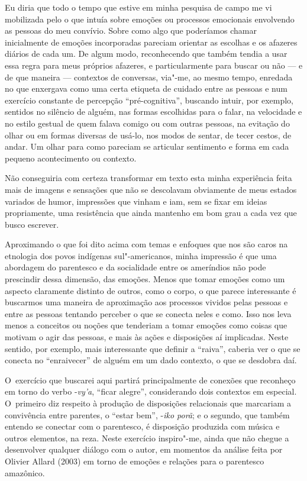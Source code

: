 Eu diria que todo o tempo que estive em minha pesquisa de campo me vi
mobilizada pelo o que intuía sobre emoções ou processos emocionais
envolvendo as pessoas do meu convívio. Sobre como algo que poderíamos
chamar inicialmente de emoções incorporadas pareciam orientar as
escolhas e os afazeres diários de cada um. De algum modo, reconhecendo
que também tendia a usar essa regra para meus próprios afazeres, e
particularmente para buscar ou não --- e de que maneira --- contextos de
conversas, via"-me, ao mesmo tempo, enredada no que enxergava como uma
certa etiqueta de cuidado entre as pessoas e num exercício constante de
percepção ``pré-cognitiva'', buscando intuir, por exemplo, sentidos no
silêncio de alguém, nas formas escolhidas para o falar, na velocidade e
no estilo gestual de quem falava comigo ou com outras pessoas, na
evitação do olhar ou em formas diversas de usá-lo, nos modos de sentar,
de tecer cestos, de andar. Um olhar para como pareciam se articular
sentimento e forma em cada pequeno acontecimento ou contexto.

Não conseguiria com certeza transformar em texto esta minha experiência
feita mais de imagens e sensações que não se descolavam obviamente de
meus estados variados de humor, impressões que vinham e iam, sem se
fixar em ideias propriamente, uma resistência que ainda mantenho em bom
grau a cada vez que busco escrever.

Aproximando o que foi dito acima com temas e enfoques que nos são caros
na etnologia dos povos indígenas sul"-americanos, minha impressão é que
uma abordagem do parentesco e da socialidade entre os ameríndios não
pode prescindir dessa dimensão, das emoções. Menos que tomar emoções
como um aspecto claramente distinto de outros, como o corpo, o que
parece interessante é buscarmos uma maneira de aproximação aos
processos vividos pelas pessoas e entre as pessoas tentando perceber o
que se conecta neles e como. Isso nos leva menos a conceitos ou noções
que tenderiam a tomar emoções como coisas que motivam o agir das
pessoas, e mais às ações e disposições aí implicadas. Neste sentido,
por exemplo, mais interessante que definir a ``raiva'', caberia ver o que
se conecta no ``enraivecer'' de alguém em um dado contexto, o que se
desdobra daí.

O~exercício que buscarei aqui partirá principalmente de conexões que
reconheço em torno do verbo -\emph{vy’a}, ``ficar alegre'', considerando dois
contextos em especial. O~primeiro diz respeito à produção de
disposições relacionais que marcariam a convivência entre parentes, o
``estar bem'', -\emph{iko porã}; e o segundo, que também entendo se conectar com
o parentesco, é disposição produzida com música e outros elementos, na
reza. Neste exercício inspiro"-me, ainda que não chegue a desenvolver
qualquer diálogo com o autor, em momentos da análise feita por Olivier
Allard (2003) em torno de emoções e relações para o parentesco
amazônico.

